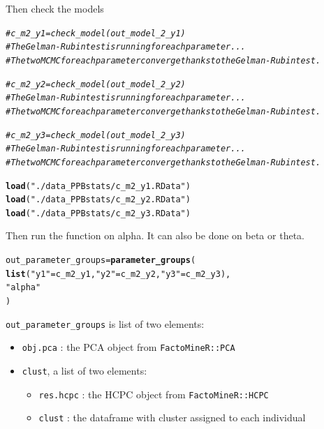 \documentclass{book}\usepackage[]{graphicx}\usepackage[]{color}
\makeatletter
\newcommand{\hlstr}[1]{\textcolor[rgb]{0.192,0.494,0.8}{#1}}%
\newcommand{\hlcom}[1]{\textcolor[rgb]{0.678,0.584,0.686}{\textit{#1}}}%
\newcommand{\hlstd}[1]{\textcolor[rgb]{0.345,0.345,0.345}{#1}}%
\newcommand{\hlkwb}[1]{\textcolor[rgb]{0.69,0.353,0.396}{#1}}%
\newcommand{\hlkwd}[1]{\textcolor[rgb]{0.737,0.353,0.396}{\textbf{#1}}}%
\newenvironment{kframe}{%
 \def\at@end@of@kframe{}%
 \ifinner\ifhmode%
  \def\at@end@of@kframe{\end{minipage}}%
  \begin{minipage}{\columnwidth}%
 \fi\fi%
 \def\FrameCommand##1{\hskip\@totalleftmargin \hskip-\fboxsep
 \colorbox{shadecolor}{##1}\hskip-\fboxsep
     \hskip-\linewidth \hskip-\@totalleftmargin \hskip\columnwidth}%
 \MakeFramed {\advance\hsize-\width
   \@totalleftmargin\z@ \linewidth\hsize
   \@setminipage}}%
 {\par\unskip\endMakeFramed%
 \at@end@of@kframe}
\newenvironment{knitrout}{}{} %
\makeatother
\begin{document}
Then check the models

\begin{knitrout}
\color{fgcolor}\begin{kframe}
\begin{alltt}
\hlcom{# c_m2_y1 = check_model(out_model_2_y1)}
\hlcom{# The Gelman-Rubin test is running for each parameter ...}
\hlcom{# The two MCMC for each parameter converge thanks to the Gelman-Rubin test.}

\hlcom{# c_m2_y2 = check_model(out_model_2_y2)}
\hlcom{# The Gelman-Rubin test is running for each parameter ...}
\hlcom{# The two MCMC for each parameter converge thanks to the Gelman-Rubin test.}

\hlcom{# c_m2_y3 = check_model(out_model_2_y3)}
\hlcom{# The Gelman-Rubin test is running for each parameter ...}
\hlcom{# The two MCMC for each parameter converge thanks to the Gelman-Rubin test.}

\hlkwd{load}\hlstd{(}\hlstr{"./data_PPBstats/c_m2_y1.RData"}\hlstd{)}
\hlkwd{load}\hlstd{(}\hlstr{"./data_PPBstats/c_m2_y2.RData"}\hlstd{)}
\hlkwd{load}\hlstd{(}\hlstr{"./data_PPBstats/c_m2_y3.RData"}\hlstd{)}
\end{alltt}
\end{kframe}
\end{knitrout}

Then run the function on alpha. 
It can also be done on beta or theta.

\begin{knitrout}
\color{fgcolor}\begin{kframe}
\begin{alltt}
\hlstd{out_parameter_groups} \hlkwb{=} \hlkwd{parameter_groups}\hlstd{(}
  \hlkwd{list}\hlstd{(}\hlstr{"y1"} \hlstd{= c_m2_y1,} \hlstr{"y2"} \hlstd{= c_m2_y2,} \hlstr{"y3"} \hlstd{= c_m2_y3),}
  \hlstr{"alpha"}
  \hlstd{)}
\end{alltt}
\end{kframe}
\end{knitrout}

\texttt{out\_parameter\_groups} is list of two elements:

\begin{itemize}
\item\texttt{obj.pca} : the PCA object from \texttt{FactoMineR::PCA}
\item \texttt{clust}, a list of two elements:
\begin{itemize}
  \item \texttt{res.hcpc} : the HCPC object from \texttt{FactoMineR::HCPC}
  \item \texttt{clust} : the dataframe with cluster assigned to each individual
  \end{itemize}
\end{itemize}
\end{document}
